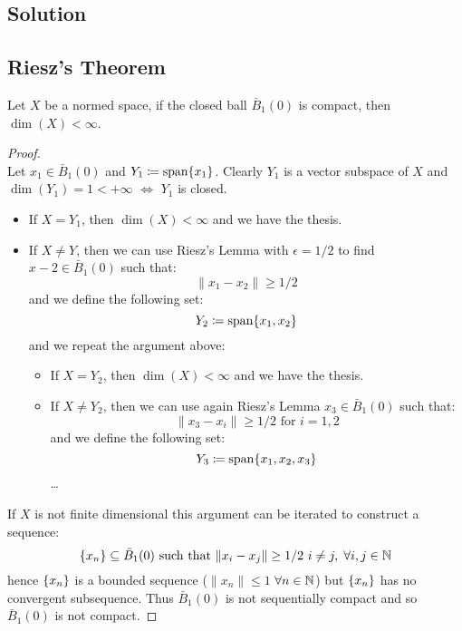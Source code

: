 \subsection*{Solution}

\subsection{Riesz's Theorem}
Let $X$ be a normed space, if the closed ball $\bar{B}_1(0)$ is compact, then $\dim(X)<\infty$.

\begin{proof}
    \hspace*{\fill}\\ %
    Let $x_1 \in \bar{B}_1(0)$ and $Y_1 \coloneqq \operatorname{span}\{x_1 \}$. Clearly $Y_1$ is a vector subspace of $X$ and $\dim(Y_1)=1<+\infty$ $\iff$ $Y_1$ is closed.
    \begin{itemize}
        \item If $X=Y_1$, then $\dim(X) < \infty$ and we have the thesis.
        \item If $X \neq Y$, then we can use Riesz's Lemma with $\epsilon = 1/2$ to find $x-2 \in \bar{B}_1(0)$ such that:
            \[ \| x_1 - x_2 \| \geq 1/2 \]
            and we define the following set:
            \[ Y_2 \coloneqq \operatorname{span}\{x_1, x_2 \} \]
        and we repeat the argument above:
        \begin{itemize}
            \item If $X=Y_2$, then $\dim(X) < \infty$ and we have the thesis.
            \item If $X \neq Y_2$, then we can use again Riesz's Lemma $x_3 \in \bar{B}_1(0)$ such that:
                \[ \| x_3 - x_i \| \geq 1/2 \text{ for } i=1,2 \]
                and we define the following set:
                \[ Y_3 \coloneqq \operatorname{span}\{x_1, x_2, x_3 \} \]
                \dots
        \end{itemize}
    \end{itemize}
    If $X$ is not finite dimensional this argument can be iterated to construct a sequence:
    \[ \{ x_n \} \subseteq \bar{B}_1(0) \text{ such that } \| x_i - x_j \| \geq 1/2 \text{ } i \neq j, \; \forall i,j \in \mathbb{N} \]
    hence $\{ x_n \}$ is a bounded sequence ($\|x_n\| \leq 1$ $\forall n \in \mathbb{N}$) but $\{ x_n \}$ has no convergent subsequence. Thus $\bar{B}_1(0)$ is not sequentially compact and so $\bar{B}_1(0)$ is not compact. 
\end{proof}


